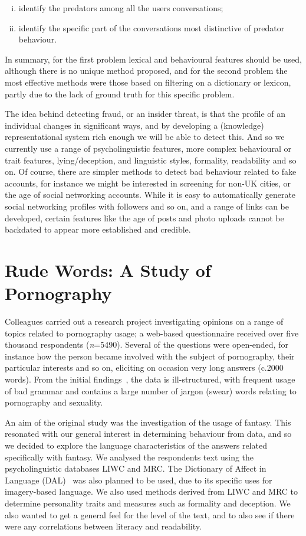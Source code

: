 \documentclass[letterpaper]{article}
\begin{document}
\begin{enumerate}[(i)]
\item identify the predators among all the users conversations;
\item identify the specific part of the conversations most distinctive
  of predator behaviour.
\end{enumerate}

In summary, for the first problem lexical and behavioural features
should be used, although there is no unique method proposed, and for
the second problem the most effective methods were those based on
filtering on a dictionary or lexicon, partly due to the lack of ground
truth for this specific problem.

The idea behind detecting fraud, or an insider threat, is that the
profile of an individual changes in significant ways, and by
developing a (knowledge) representational system rich enough we will
be able to detect this. And so we currently use a range of
psycholinguistic features, more complex behavioural or trait features,
lying/deception, and linguistic styles, formality, readability and so
on. Of course, there are simpler methods to detect bad behaviour
related to fake accounts, for instance we might be interested in
screening for non-UK cities, or the age of social networking
accounts. While it is easy to automatically generate social networking
profiles with followers and so on, and a range of links can be
developed, certain features like the age of posts and photo uploads
cannot be backdated to appear more established and credible.


\section{Rude Words: A Study of Pornography}

Colleagues carried out a research project investigating opinions on a
range of topics related to pornography usage; a web-based
questionnaire received over five thousand respondents
({\emph{n}}=5490). Several of the questions were open-ended, for instance how
the person became involved with the subject of pornography, their
particular interests and so on, eliciting on occasion very long
answers (c.2000 words). From the initial
findings~\cite{smith-et-al:2013}, the data is ill-structured, with
frequent usage of bad grammar and contains a large number of jargon
(swear) words relating to pornography and sexuality.

An aim of the original study was the investigation of the usage of
fantasy. This resonated with our general interest in determining
behaviour from data, and so we decided to explore the language
characteristics of the answers related specifically with fantasy. We
analysed the respondents text using the psycholinguistic databases
LIWC and MRC. The Dictionary of Affect in Language
(DAL)~\cite{sweeney+whissell:1984} was also planned to be used, due to
its specific uses for imagery-based language. We also used methods
derived from LIWC and MRC to determine personality traits and measures
such as formality and deception. We also wanted to get a general feel
for the level of the text, and to also see if there were any
correlations between literacy and readability.
\end{document}
